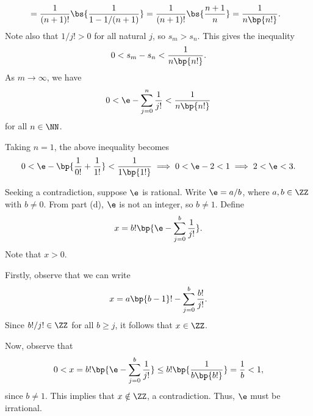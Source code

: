 \begin{solution}
\begin{ppart}
\begin{align*}
            &= \frac1{(n+1)!} \bs{\frac1{1 - 1/(n+1)}} = \frac1{(n+1)!} \bs{\frac{n+1}{n}} = \frac{1}{n\bp{n!}}.
        \end{align*}
        Note also that $1/j! > 0$ for all natural $j$, so $s_m > s_n$. This gives the inequality \[0 < s_m - s_n < \frac{1}{n\bp{n!}}.\] As $m \to \infty$, we have \[0 < \e - \sum_{j = 0}^n \frac1{j!} < \frac1{n\bp{n!}}\] for all $n \in \NN$.
    \end{ppart}
    \begin{ppart}
        Taking $n = 1$, the above inequality becomes \[0 < \e - \bp{\frac1{0!} + \frac1{1!}} < \frac1{1 \bp{1!}} \implies 0 < \e - 2 < 1 \implies 2 < \e < 3.\]
    \end{ppart}
    \begin{ppart}
        Seeking a contradiction, suppose $\e$ is rational. Write $\e = a/b$, where $a, b \in \ZZ$ with $b \neq 0$. From part (d), $\e$ is not an integer, so $b \neq 1$. Define \[x = b! \bp{\e - \sum_{j = 0}^b \frac1{j!}}.\] Note that $x > 0$. 
        
        Firstly, observe that we can write \[x = a\bp{b - 1}! - \sum_{j = 0}^b \frac{b!}{j!}.\] Since $b!/j! \in \ZZ$ for all $b \geq j$, it follows that $x \in \ZZ$.

        Now, observe that \[0 < x = b! \bp{\e - \sum_{j = 0}^b \frac1{j!}} \leq b! \bp{\frac1{b \bp{b!}}} = \frac1b < 1,\] since $b \neq 1$. This implies that $x \notin \ZZ$, a contradiction. Thus, $\e$ must be irrational.
    \end{ppart}
\end{solution}

